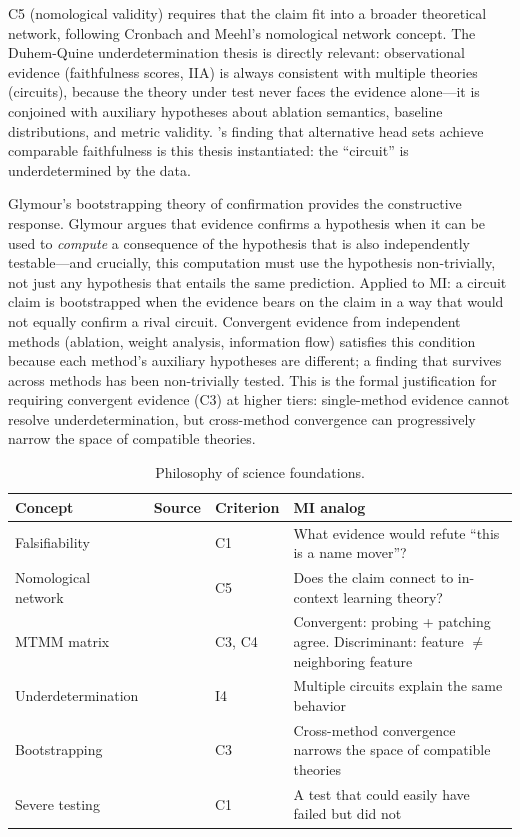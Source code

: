 \documentclass{article}
\begin{document}
C5 (nomological validity) requires that the claim fit into a broader theoretical network, following Cronbach and Meehl's nomological network concept. The Duhem-Quine underdetermination thesis \citep{quine1951two, duhem1906theorie} is directly relevant: observational evidence (faithfulness scores, IIA) is always consistent with multiple theories (circuits), because the theory under test never faces the evidence alone---it is conjoined with auxiliary hypotheses about ablation semantics, baseline distributions, and metric validity. \citet{meloux2025everything}'s finding that alternative head sets achieve comparable faithfulness is this thesis instantiated: the ``circuit'' is underdetermined by the data.

Glymour's bootstrapping theory of confirmation \citep{glymour1980theory} provides the constructive response. Glymour argues that evidence confirms a hypothesis when it can be used to \emph{compute} a consequence of the hypothesis that is also independently testable---and crucially, this computation must use the hypothesis non-trivially, not just any hypothesis that entails the same prediction. Applied to MI: a circuit claim is bootstrapped when the evidence bears on the claim in a way that would not equally confirm a rival circuit. Convergent evidence from independent methods (ablation, weight analysis, information flow) satisfies this condition because each method's auxiliary hypotheses are different; a finding that survives across methods has been non-trivially tested. This is the formal justification for requiring convergent evidence (C3) at higher tiers: single-method evidence cannot resolve underdetermination, but cross-method convergence can progressively narrow the space of compatible theories.

\begin{table}[H]
\centering\small
\caption{Philosophy of science foundations.}
\renewcommand{\arraystretch}{1.12}
\begin{tabular}{@{}l>{\raggedright\arraybackslash}p{2cm}l>{\raggedright\arraybackslash}p{4.5cm}@{}}
\toprule
\textbf{Concept} & \textbf{Source} & \textbf{Criterion} & \textbf{MI analog} \\
\midrule
Falsifiability & \citet{popper1959logic} & C1 & What evidence would refute ``this is a name mover''? \\
\midrule
Nomological network & \citet{cronbach1955construct} & C5 & Does the claim connect to in-context learning theory? \\
\midrule
MTMM matrix & \citet{campbell1959convergent} & C3, C4 & Convergent: probing + patching agree. Discriminant: feature $\neq$ neighboring feature \\
\midrule
Underdetermination & \citet{quine1951two, duhem1906theorie} & I4 & Multiple circuits explain the same behavior \\
\midrule
Bootstrapping & \citet{glymour1980theory} & C3 & Cross-method convergence narrows the space of compatible theories \\
\midrule
Severe testing & \citet{mayo2018statistical} & C1 & A test that could easily have failed but did not \\
\bottomrule
\end{tabular}
\end{table}
\end{document}
